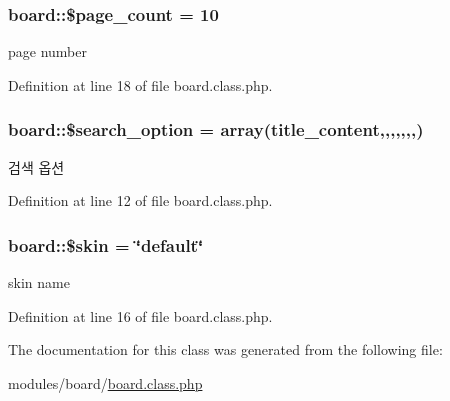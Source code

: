 \subsubsection[{\$page\+\_\+count}]{\setlength{\rightskip}{0pt plus 5cm}board\+::\$page\+\_\+count = 10}\label{classboard_ab5d2d3925f753039483da2c65076122b}


page number 



Definition at line 18 of file board.\+class.\+php.

\hypertarget{classboard_a6affe0c86966ebd06572cc4c8abde32b}{}
\subsubsection[{\$search\+\_\+option}]{\setlength{\rightskip}{0pt plus 5cm}board\+::\$search\+\_\+option = array(\textquotesingle{}title\+\_\+content\textquotesingle{},\textquotesingle{},\textquotesingle{},\textquotesingle{},\textquotesingle{},\textquotesingle{},\textquotesingle{},\textquotesingle{})}\label{classboard_a6affe0c86966ebd06572cc4c8abde32b}


검색 옵션 



Definition at line 12 of file board.\+class.\+php.

\hypertarget{classboard_ac7e864ad1db563c4d3f97291dd90291f}{}
\subsubsection[{\$skin}]{\setlength{\rightskip}{0pt plus 5cm}board\+::\$skin = \char`\"{}default\char`\"{}}\label{classboard_ac7e864ad1db563c4d3f97291dd90291f}


skin name 



Definition at line 16 of file board.\+class.\+php.



The documentation for this class was generated from the following file\+:\begin{DoxyCompactItemize}
\item 
modules/board/\hyperlink{board_8class_8php}{board.\+class.\+php}\end{DoxyCompactItemize}
